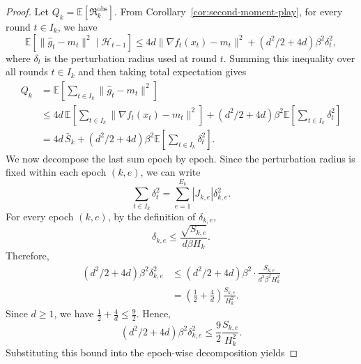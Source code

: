 \documentclass[10pt,a4paper]{amsart}
\newcommand{\regret}{\mathfrak{R}}
\begin{document}
\begin{proof}
Let $Q_k=\mathbb E[\regret_k^{\mathrm{obs}}]$. From Corollary~\ref{cor:second-moment-play}, for every round $t\in I_k$, we have
\begin{equation*}
\mathbb E\!\left[
    \|\hat g_t-m_t\|^2
    \mid \mathcal H_{t-1}
\right]
\le
4d\|\nabla f_t(x_t)-m_t\|^2
+
(d^2/2+4d)\beta^2\delta_t^2,
\end{equation*}
where $\delta_t$ is the perturbation radius used at round $t$. Summing this
inequality over all rounds $t\in I_k$ and then taking total expectation gives
\begin{equation*}
\begin{aligned}
    Q_k
    &=
    \mathbb E\left[
        \sum_{t\in I_k}\|\hat g_t-m_t\|^2
    \right]  \\
    &\le
    4d\,
    \mathbb E\left[
        \sum_{t\in I_k}\|\nabla f_t(x_t)-m_t\|^2
    \right]
    +
    (d^2/2+4d)\beta^2
    \mathbb E\left[
        \sum_{t\in I_k}\delta_t^2
    \right]  \\
    &=
    4d\,\bar S_k
    +
    (d^2/2+4d)\beta^2
    \mathbb E\left[
        \sum_{t\in I_k}\delta_t^2
    \right].
\end{aligned}
\end{equation*}
We now decompose the last sum epoch by epoch. Since the perturbation radius is
fixed within each epoch $(k,e)$, we can write
\begin{equation*}
    \sum_{t\in I_k}\delta_t^2
    =
    \sum_{e=1}^{E_k}|J_{k,e}|\delta_{k,e}^2.
\end{equation*}
For every epoch $(k,e)$, by the definition of $\delta_{k,e}$,
\begin{equation*}
    \delta_{k,e}
    \le
    \frac{\sqrt{S_{k,e}}}{d\beta H_k}.
\end{equation*}
Therefore,
\begin{equation*}
\begin{aligned}
    (d^2/2+4d)\beta^2\delta_{k,e}^2
    &\le
    (d^2/2+4d)\beta^2
    \cdot
    \frac{S_{k,e}}{d^2\beta^2H_k^2}  \\
    &=
    \left(\frac12+\frac4d\right)
    \frac{S_{k,e}}{H_k^2}.
\end{aligned}
\end{equation*}
Since $d\ge1$, we have $\frac12+\frac4d\le \frac92$. Hence,
\begin{equation*}
    (d^2/2+4d)\beta^2\delta_{k,e}^2
    \le
    \frac92\frac{S_{k,e}}{H_k^2}.
\end{equation*}
Substituting this bound into the epoch-wise decomposition yields

\end{proof}
\end{document}
